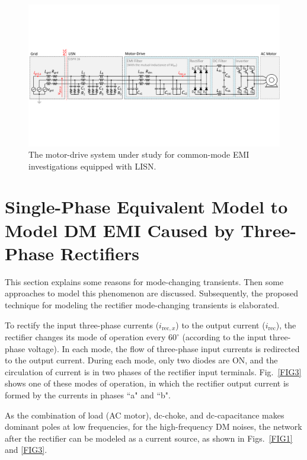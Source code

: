 \documentclass[journal,a4paper,10pt,twoside]{IEEEtran} %
\begin{document}
		\begin{figure}[t]
			    \centering
			    \includegraphics[clip, trim=0cm 5.5cm 0cm 5cm, width=1\linewidth]{FIGS/FIG_8.pdf}
			    \caption{The motor-drive system under study for common-mode EMI investigations equipped with LISN.}
			    \label{FIG8}
			    \vspace{-5mm}
	    \end{figure}

	\section{Single-Phase Equivalent Model to Model DM EMI Caused by Three-Phase Rectifiers}
	This section explains some reasons for mode-changing transients. Then some approaches to model this phenomenon are discussed. Subsequently, the proposed technique for modeling the rectifier mode-changing transients is elaborated.
	
	To rectify the input three-phase currents ($i_{\mathrm{rec},x}$) to the output current ($i_\mathrm{rec}$), the rectifier changes its mode of operation every $60^\circ$ (according to the input three-phase voltage). In each mode, the flow of three-phase input currents is redirected to the output current. During each mode, only two diodes are ON, and the circulation of current is in two phases of the rectifier input terminals. Fig.~\ref{FIG3} shows one of these modes of operation, in which the rectifier output current is formed by the currents in phases ``a" and ``b". 
	
	{\color{blue} As the combination of load (AC motor), dc-choke, and dc-capacitance makes dominant poles at low frequencies, for the high-frequency DM noises, the network after the rectifier can be modeled as a current source, as shown in Figs.~\ref{FIG1} and \ref{FIG3}.}
	
\end{document}
